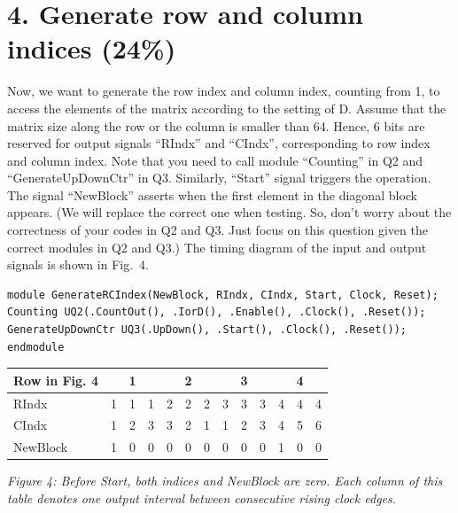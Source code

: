 \documentclass[11pt,a4paper]{article}
\begin{document}
\section*{4. Generate row and column indices (24\%)}
Now, we want to generate the row index and column index, counting from 1, to access the elements of the matrix according to the setting of D. Assume that the matrix size along the row or the column is smaller than 64. Hence, 6 bits are reserved for output signals ``RIndx'' and ``CIndx'', corresponding to row index and column index. Note that you need to call module ``Counting'' in Q2 and ``GenerateUpDownCtr'' in Q3. Similarly, ``Start'' signal triggers the operation. The signal ``NewBlock'' asserts when the first element in the diagonal block appears. (We will replace the correct one when testing. So, don't worry about the correctness of your codes in Q2 and Q3. Just focus on this question given the correct modules in Q2 and Q3.) The timing diagram of the input and output signals is shown in Fig.~4.
\par\medskip\noindent\begin{minipage}{\linewidth}
\begin{lstlisting}
module GenerateRCIndex(NewBlock, RIndx, CIndx, Start, Clock, Reset);
Counting UQ2(.CountOut(), .IorD(), .Enable(), .Clock(), .Reset());
GenerateUpDownCtr UQ3(.UpDown(), .Start(), .Clock(), .Reset());
endmodule
\end{lstlisting}
\end{minipage}\par
\begin{center}
\small
\begin{tabular}{lrrrrrrrrrrrr}
\toprule
Row in Fig. 4 & \multicolumn{3}{c}{1} & \multicolumn{3}{c}{2} & \multicolumn{3}{c}{3} & \multicolumn{3}{c}{4}\\
\midrule
RIndx & 1&1&1&2&2&2&3&3&3&4&4&4\\
CIndx & 1&2&3&3&2&1&1&2&3&4&5&6\\
NewBlock & 1&0&0&0&0&0&0&0&0&1&0&0\\
\bottomrule
\end{tabular}
\end{center}
\textit{Figure 4: Before Start, both indices and NewBlock are zero. Each column of this table denotes one output interval between consecutive rising clock edges.}
\end{document}
